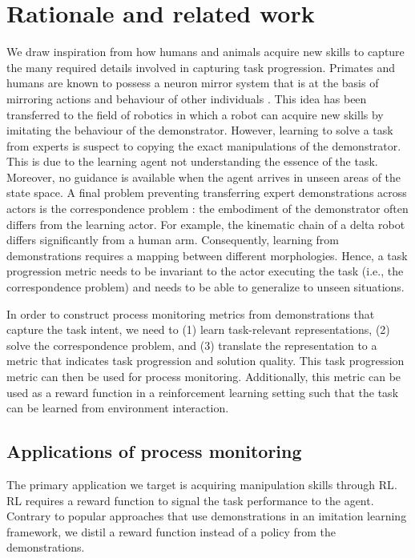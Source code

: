 \documentclass[\home/main.tex]{subfiles}
\begin{document}
\section{Rationale and related work} \label{sec:rewards_rationale}

We draw inspiration from how humans and animals acquire new skills to capture the many required details involved in capturing task progression. Primates and humans are known to possess a neuron mirror system that is at the basis of mirroring actions and behaviour of other individuals \autocite{Gallese2004}. This idea has been transferred to the field of robotics \autocite{Argall2009} in which a robot can acquire new skills by imitating the behaviour of the demonstrator. However, learning to solve a task from experts is suspect to copying the exact manipulations of the demonstrator. This is due to the learning agent not understanding the essence of the task. Moreover, no guidance is available when the agent arrives in unseen areas of the state space. A final problem preventing transferring expert demonstrations across actors is the correspondence problem \autocite{Nehavic2002}: the embodiment of the demonstrator often differs from the learning actor. For example, the kinematic chain of a delta robot differs significantly from a human arm. Consequently, learning from demonstrations requires a mapping between different morphologies. Hence, a task progression metric needs to be invariant to the actor executing the task (i.e., the correspondence problem) and needs to be able to generalize to unseen situations.

In order to construct process monitoring metrics from demonstrations that capture the task intent, we need to (1) learn task-relevant representations, (2) solve the correspondence problem, and (3) translate the representation to a metric that indicates task progression and solution quality. This task progression metric can then be used for process monitoring. Additionally, this metric can be used as a reward function in a reinforcement learning setting such that the task can be learned from environment interaction.

\subsection{Applications of process monitoring}
The primary application we target is acquiring manipulation skills through \gls{RL}. \gls{RL} requires a reward function to signal the task performance to the agent. Contrary to popular approaches that use demonstrations in an imitation learning framework, we distil a reward function instead of a policy from the demonstrations.
\end{document}
